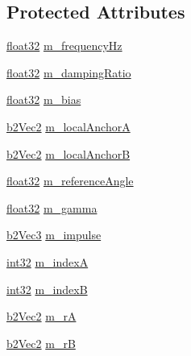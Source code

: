 \subsection*{Protected Attributes}
\begin{DoxyCompactItemize}
\item 
\mbox{\hyperlink{b2_settings_8h_aacdc525d6f7bddb3ae95d5c311bd06a1}{float32}} \mbox{\hyperlink{classb2_weld_joint_aa3cd6f08f509f67ad068d0ded7df9f21}{m\+\_\+frequency\+Hz}}
\item 
\mbox{\hyperlink{b2_settings_8h_aacdc525d6f7bddb3ae95d5c311bd06a1}{float32}} \mbox{\hyperlink{classb2_weld_joint_a4a730af358f79a6ccd7641e198eb5c7b}{m\+\_\+damping\+Ratio}}
\item 
\mbox{\hyperlink{b2_settings_8h_aacdc525d6f7bddb3ae95d5c311bd06a1}{float32}} \mbox{\hyperlink{classb2_weld_joint_af54a943c1476e6a7c7bcfdf6cf568ba3}{m\+\_\+bias}}
\item 
\mbox{\hyperlink{structb2_vec2}{b2\+Vec2}} \mbox{\hyperlink{classb2_weld_joint_a572689c5f8c3df6902d64c56a2bb88f2}{m\+\_\+local\+AnchorA}}
\item 
\mbox{\hyperlink{structb2_vec2}{b2\+Vec2}} \mbox{\hyperlink{classb2_weld_joint_a39854cb14c83f88ec65d232b08e70704}{m\+\_\+local\+AnchorB}}
\item 
\mbox{\hyperlink{b2_settings_8h_aacdc525d6f7bddb3ae95d5c311bd06a1}{float32}} \mbox{\hyperlink{classb2_weld_joint_a77639b3636192d6ac7083b33394ae943}{m\+\_\+reference\+Angle}}
\item 
\mbox{\hyperlink{b2_settings_8h_aacdc525d6f7bddb3ae95d5c311bd06a1}{float32}} \mbox{\hyperlink{classb2_weld_joint_a29a8fc5e8efa796f7a7b439b4978f716}{m\+\_\+gamma}}
\item 
\mbox{\hyperlink{structb2_vec3}{b2\+Vec3}} \mbox{\hyperlink{classb2_weld_joint_a47db737b0d94628e7839718cf91cf762}{m\+\_\+impulse}}
\item 
\mbox{\hyperlink{b2_settings_8h_a43d43196463bde49cb067f5c20ab8481}{int32}} \mbox{\hyperlink{classb2_weld_joint_a4a3aa65b0a4669478db292f6765b03dd}{m\+\_\+indexA}}
\item 
\mbox{\hyperlink{b2_settings_8h_a43d43196463bde49cb067f5c20ab8481}{int32}} \mbox{\hyperlink{classb2_weld_joint_a6e2aa1c13e8c96d9bbbdc6aae6b8e342}{m\+\_\+indexB}}
\item 
\mbox{\hyperlink{structb2_vec2}{b2\+Vec2}} \mbox{\hyperlink{classb2_weld_joint_abfbbe893b469c6855b297bdd768ba6fe}{m\+\_\+rA}}
\item 
\mbox{\hyperlink{structb2_vec2}{b2\+Vec2}} \mbox{\hyperlink{classb2_weld_joint_a2a2af228eb5c2cd38e8baf77098cc3b0}{m\+\_\+rB}}

\end{DoxyCompactItemize}
